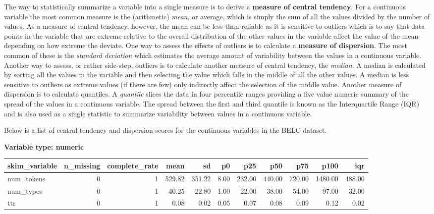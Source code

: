 \documentclass[
  letterpaper,
]{latex/krantz}
\begin{document}
The way to statistically summarize a variable into a single measure is
to derive a \textbf{measure of central tendency}. For a continuous
variable the most common measure is the (arithmetic) \emph{mean}, or
average, which is simply the sum of all the values divided by the number
of values. As a measure of central tendency, however, the mean can be
less-than-reliable as it is sensitive to outliers which is to say that
data points in the variable that are extreme relative to the overall
distribution of the other values in the variable affect the value of the
mean depending on how extreme the deviate. One way to assess the effects
of outliers is to calculate a \textbf{measure of dispersion}. The most
common of these is the \emph{standard deviation} which estimates the
average amount of variability between the values in a continuous
variable. Another way to assess, or rather side-step, outliers is to
calculate another measure of central tendency, the \emph{median}. A
median is calculated by sorting all the values in the variable and then
selecting the value which falls in the middle of all the other values. A
median is less sensitive to outliers as extreme values (if there are
few) only indirectly affect the selection of the middle value. Another
measure of dispersion is to calculate quantiles. A \emph{quantile}
slices the data in four percentile ranges providing a five value numeric
summary of the spread of the values in a continuous variable. The spread
between the first and third quantile is known as the Interquartile Range
(IQR) and is also used as a single statistic to summarize variability
between values in a continuous variable.

Below is a list of central tendency and dispersion scores for the
continuous variables in the BELC dataset.

\textbf{Variable type: numeric}

\begin{tabular}{l|r|r|r|r|r|r|r|r|r|r}
\hline
skim\_variable & n\_missing & complete\_rate & mean & sd & p0 & p25 & p50 & p75 & p100 & iqr\\
\hline
num\_tokens & 0 & 1 & 529.82 & 351.22 & 8.00 & 232.00 & 440.00 & 720.00 & 1480.00 & 488.00\\
\hline
num\_types & 0 & 1 & 40.25 & 22.80 & 1.00 & 22.00 & 38.00 & 54.00 & 97.00 & 32.00\\
\hline
ttr & 0 & 1 & 0.08 & 0.02 & 0.05 & 0.07 & 0.08 & 0.09 & 0.12 & 0.02\\
\hline
\end{tabular}
\end{document}

